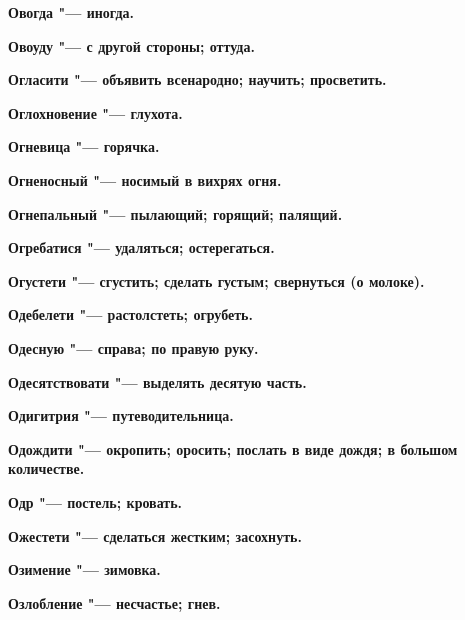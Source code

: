 \begin{mymulticols}{2}
\bfseries Овогда\normalfont{} "--- иногда. 




\bfseries Овоуду\normalfont{} "--- с другой стороны; оттуда. 




\bfseries Огласити\normalfont{} "--- объявить всенародно; научить; просветить. 




\bfseries Оглохновение\normalfont{} "--- глухота. 




\bfseries Огневица\normalfont{} "--- горячка. 




\bfseries Огненосный\normalfont{} "--- носимый в вихрях огня. 




\bfseries Огнепальный\normalfont{} "--- пылающий; горящий; палящий. 




\bfseries Огребатися\normalfont{} "--- удаляться; остерегаться. 




\bfseries Огустети\normalfont{} "--- сгустить; сделать густым; свернуться (о молоке). 




\bfseries Одебелети\normalfont{} "--- растолстеть; огрубеть. 




\bfseries Одесную\normalfont{} "--- справа; по правую руку. 




\bfseries Одесятствовати\normalfont{} "--- выделять десятую часть. 




\bfseries Одигитрия\normalfont{} "--- путеводительница. 




\bfseries Одождити\normalfont{} "--- окропить; оросить; послать в виде дождя; в большом количестве. 




\bfseries Одр\normalfont{} "--- постель; кровать. 




\bfseries Ожестети\normalfont{} "--- сделаться жестким; засохнуть. 




\bfseries Озимение\normalfont{} "--- зимовка. 




\bfseries Озлобление\normalfont{} "--- несчастье; гнев. 





\end{mymulticols}
